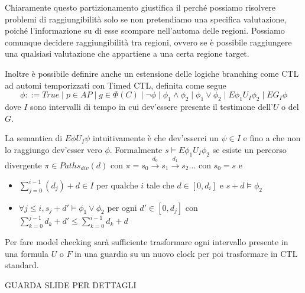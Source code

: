 Chiaramente questo partizionamento giustifica il perché possiamo risolvere problemi di raggiungibilità solo se non pretendiamo una specifica valutazione, poiché l'informazione su di esse scompare nell'automa delle regioni. Possiamo comunque decidere raggiungibilità tra regioni, ovvero se è possibile raggiungere una qualsiasi valutazione che appartiene a una certa regione target.

Inoltre è possibile definire anche un estensione delle logiche branching come CTL ad automi temporizzati con Timed CTL, definita come segue
\[\phi ::= True\mid p \in AP\mid g \in \Phi(C)\mid \neg \phi\mid \phi_1\land\phi_2\mid \phi_1\lor\phi_2\mid E \phi_1 U_I \phi_2 \mid E G_I \phi\]
dove \(I\) sono intervalli di tempo in cui dev'essere presente il testimone dell'\(U\) o del \(G\).

La semantica di \(E \phi U_I \psi\) intuitivamente è che dev'esserci un \(\psi \in I\) e fino a che non lo raggiungo dev'esser vero \(\phi\). Formalmente 
\(s\models E \phi_1 U_I \phi_2\) se esiste un percorso divergente \(\pi\in Paths_{div}(d)\) con \(\pi = s_0 \xrightarrow{d_0} s_1 \xrightarrow{d_1} s_2 \ldots\) con \(s_0 = s\) e
\begin{itemize}
  \item \(\sum_{j=0}^{i-1} (d_j )+ d \in I\) per qualche \(i\) tale che \(d \in [0,d_i]\) e \(s+d\models \phi_2\)
  \item \(\forall j\leq i, s_j+d' \models \phi_1\lor \phi_2\) per ogni \(d' \in [0,d_j]\) con \(\sum_{k=0}^{j-1} d_k+d' \leq \sum_{k=0}^{i-1} d_k + d\)
\end{itemize}

Per fare model checking sarà sufficiente trasformare ogni intervallo presente in una formula \(U\) o \(F\) in una guardia su un nuovo clock per poi trasformare in CTL standard.

GUARDA SLIDE PER DETTAGLI